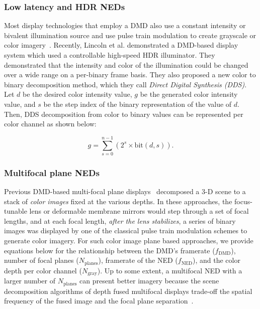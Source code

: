 \subsubsection{Low latency and HDR NEDs}
Most display technologies that employ a DMD also use a constant intensity or bivalent illumination source and use pulse train modulation to create grayscale or color imagery~\cite{Lincoln2016motion}. Recently, Lincoln et al.\cite{Lincoln2017scene} demonstrated a DMD-based display system which used a controllable high-speed HDR illuminator. They demonstrated that the intensity and color of the illumination could be changed over a wide range on a per-binary frame basis. They also proposed a new color to binary decomposition method, which they call \emph{Direct Digital Synthesis (DDS)}. Let $d$ be the desired color intensity value, $g$ be the generated color intensity value, and $s$ be the step index of the binary representation of the value of $d$. Then, DDS decomposition from color to binary values can be represented per color channel as shown below: 

\begin{equation}
g = \sum_{s = 0}^{n-1} \left(2^s \times \text{bit}(d,s)\right).
\end{equation}

\subsubsection{Multifocal plane NEDs}
Previous DMD-based multi-focal plane displays~\cite{Hu2014design,Hu2015Design} decomposed a 3-D scene to a stack of \emph{color images} fixed at the various depths. In these approaches, the focus-tunable lens or deformable membrane mirrors would step through a set of focal lengths, and at each focal length, \emph{after the lens stabilizes}, a series of binary images was displayed by one of the classical pulse train modulation schemes to generate color imagery. For such color image plane based approaches, we provide equations below for the relationship between the DMD's framerate ($f_{\text{DMD}}$), number of focal planes ($N_{\text{planes}}$), framerate of the NED ($f_{\text{NED}}$), and the color depth per color channel ($N_{\text{gray}}$). Up to some extent, a multifocal NED with a larger number of $N_{\text{planes}}$ can present better imagery because the scene decomposition algorithms of depth fused multifocal displays trade-off the spatial frequency of the fused image and the focal plane separation~\cite{Hu2014design,Hua2017Enabling}. 

